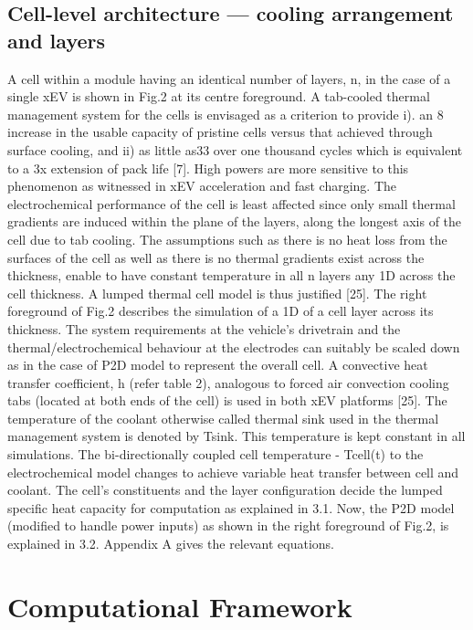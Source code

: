 \subsection{Cell-level architecture --- cooling arrangement and layers}

A cell within a module having an identical number of layers, n, in the case of a
single xEV  is shown  in Fig.2  at its centre  foreground. A  tab-cooled thermal
management system for the cells is envisaged as a criterion to provide i). an 8%
increase in the  usable capacity of pristine cells versus  that achieved through
surface cooling,  and ii) as  little as33%
over one thousand cycles which is equivalent to a 3x extension of pack life [7].
High  powers  are  more  sensitive  to  this  phenomenon  as  witnessed  in  xEV
acceleration and fast  charging. The electrochemical performance of  the cell is
least affected since  only small thermal gradients are induced  within the plane
of  the layers,  along the  longest axis  of the  cell due  to tab  cooling. The
assumptions such as there is no heat loss  from the surfaces of the cell as well
as there  is no  thermal gradients  exist across the  thickness, enable  to have
constant  temperature in  all  n layers  any  1D across  the  cell thickness.  A
lumped  thermal  cell  model  is  thus  justified  [25].  The  right  foreground
of  Fig.2  describes  the  simulation  of  a 1D  of  a  cell  layer  across  its
thickness.  The  system  requirements  at the  vehicle’s  drivetrain  and  the
thermal/electrochemical behaviour at the electrodes  can suitably be scaled down
as in  the case of P2D  model to represent  the overall cell. A  convective heat
transfer  coefficient, h  (refer table  2), analogous  to forced  air convection
cooling tabs (located  at both ends of  the cell) is used in  both xEV platforms
[25]. The temperature  of the coolant otherwise called thermal  sink used in the
thermal management system is denoted by Tsink. This temperature is kept constant
in all simulations. The bi-directionally  coupled cell temperature - Tcell(t) to
the electrochemical model changes to achieve variable heat transfer between cell
and coolant.  The cell’s constituents  and the layer configuration  decide the
lumped specific heat capacity for computation  as explained in 3.1. Now, the P2D
model (modified  to handle  power inputs)  as shown in  the right  foreground of
Fig.2, is explained in 3.2. Appendix A gives the relevant equations.

\section{Computational Framework}\label{sec:layeroptframework}

